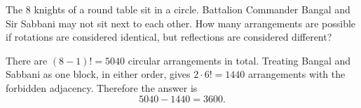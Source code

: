The 8 knights of a round table sit in a circle. Battalion Commander Bangal and Sir Sabbani may not sit next to each other. How many arrangements are possible if rotations are considered identical, but reflections are considered different?

\begin{solution}
There are $(8-1)!=5040$ circular arrangements in total. Treating
Bangal and Sabbani as one block, in either order, gives $2\cdot6!=1440$
arrangements with the forbidden adjacency. Therefore the answer is
\[
\boxed{5040-1440=3600}.
\]
\end{solution}
